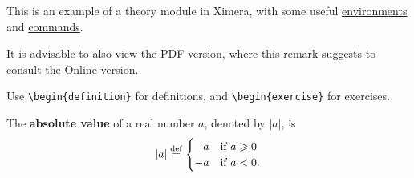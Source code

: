 \documentclass{ximera}
\begin{document}
    \author{Wim Obbels}
    \label{xim:ximeraDemo}

This is an example of a theory module in Ximera, 
with some useful \hyperref[xim:ximeraEnvironments]{environments} and \hyperref[xim:ximeraCommands]{commands}.

\begin{onlineOnly}
 \begin{remark}
    It is advisable to also view the PDF version, 
    where this remark suggests to consult the Online version.
 \end{remark}
\end{onlineOnly}

Use \verb|\begin{definition}| for definitions, and \verb|\begin{exercise}| for exercises.

\begin{definition}\label{showcase:absolutevalue}
	The \textbf{absolute value} of a real number $a$, denoted by $|a|$, is
	\[
		|a| \overset{\mathrm{def}}{=} \begin{cases}
				        \phantom{-}a  & \text{if } a \geqslant 0 \\
				                  -a  & \text{if } a<0.
			        \end{cases}
	\]
\end{definition}
\end{document}
